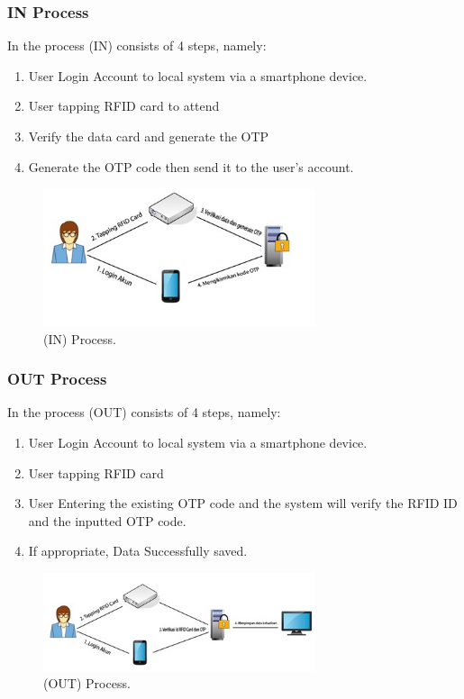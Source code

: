 \subsubsection{IN Process} 
In the process (IN) consists of 4 steps, namely:

\begin{enumerate}
    \item 
    User Login Account to local system via a smartphone device.
    \item
     User tapping RFID card to attend
    \item 
    Verify the data card and generate the OTP
    \item
    Generate the OTP code then send it to the user's account.
\end{enumerate}
\begin{figure}[ht]
\begin{center}
\includegraphics[width=8cm]{figures/Masuk.jpg}
\end{center}
\caption{(IN) Process.
\label{eq:30}}
\end{figure}  

\subsubsection{OUT Process} 
In the process (OUT) consists of 4 steps, namely:

\begin{enumerate}
    \item 
    User Login Account to local system via a smartphone device.
    \item
     User tapping RFID card
    \item 
    User Entering the existing OTP code and the system will verify the RFID ID and the inputted OTP code.
    \item
    If appropriate, Data Successfully saved.
\end{enumerate}
\begin{figure}[ht]
\begin{center}
\includegraphics[width=8cm]{figures/Keluar.jpg}
\end{center}
\caption{(OUT) Process.
\label{eq:30}}
\end{figure} 